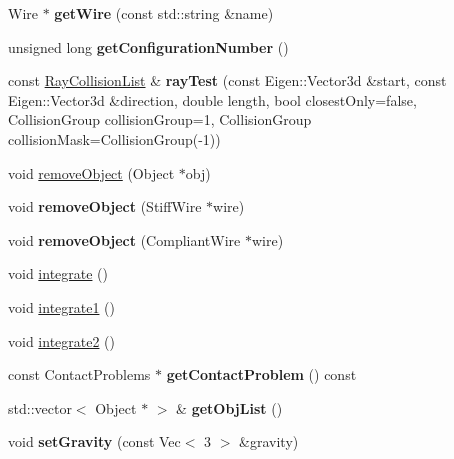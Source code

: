 \begin{DoxyCompactItemize}
Wire $\ast$ {\bfseries get\+Wire} (const std\+::string \&name)
\item 
\mbox{\label{classraisim_1_1World_a5368923000b8b9e5e049903ab57c11b4}} 
unsigned long {\bfseries get\+Configuration\+Number} ()
\item 
\mbox{\label{classraisim_1_1World_a764cf9a1fedef67e19c735e684d52765}} 
const \hyperlink{classraisim_1_1RayCollisionList}{Ray\+Collision\+List} \& {\bfseries ray\+Test} (const Eigen\+::\+Vector3d \&start, const Eigen\+::\+Vector3d \&direction, double length, bool closest\+Only=false, Collision\+Group collision\+Group=1, Collision\+Group collision\+Mask=Collision\+Group(-\/1))
\item 
void \hyperlink{classraisim_1_1World_ae04b2e261ee5703145ef4113b604c77f}{remove\+Object} (Object $\ast$obj)
\item 
\mbox{\label{classraisim_1_1World_a1649d28c36b41a3aa5304ce007a4fbd6}} 
void {\bfseries remove\+Object} (Stiff\+Wire $\ast$wire)
\item 
\mbox{\label{classraisim_1_1World_a9e5977bf54f0235830881af16a39118c}} 
void {\bfseries remove\+Object} (Compliant\+Wire $\ast$wire)
\item 
void \hyperlink{classraisim_1_1World_a469054d6525c640a978abfaf3da71a33}{integrate} ()
\item 
void \hyperlink{classraisim_1_1World_ac24197f5e93fde3a9dad48766ef32084}{integrate1} ()
\item 
void \hyperlink{classraisim_1_1World_a959490c4b2355761ad0623e971522600}{integrate2} ()
\item 
\mbox{\label{classraisim_1_1World_ab23b99ad469c64391457452e1bc3c53d}} 
const Contact\+Problems $\ast$ {\bfseries get\+Contact\+Problem} () const
\item 
\mbox{\label{classraisim_1_1World_a5f2c5f6ef946337229f4d9b157399e72}} 
std\+::vector$<$ Object $\ast$ $>$ \& {\bfseries get\+Obj\+List} ()
\item 
\mbox{\label{classraisim_1_1World_a1652fdb4ae465d7d593059208c848142}} 
void {\bfseries set\+Gravity} (const Vec$<$ 3 $>$ \&gravity)

\end{DoxyCompactItemize}

